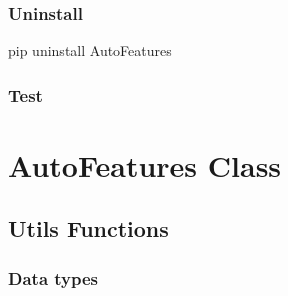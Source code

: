 \documentclass[letterpaper,11pt,english]{sphinxmanual}
\begin{document}
\subsubsection{Uninstall}
\label{\detokenize{install:uninstall}}
\begin{sphinxVerbatim}[commandchars=\\\{\}]
pip uninstall AutoFeatures
\end{sphinxVerbatim}


\subsubsection{Test}
\label{\detokenize{install:test}}

\section{AutoFeatures Class}
\label{\detokenize{auto_feature:autofeatures-class}}\label{\detokenize{auto_feature:form-frame}}\label{\detokenize{auto_feature::doc}}

\subsection{Utils Functions}
\label{\detokenize{auto_feature:utils-functions}}

\subsubsection{Data types}
\label{\detokenize{auto_feature:data-types}}
\end{document}
